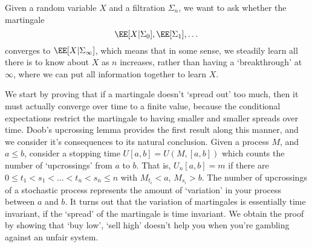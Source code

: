 \begin{example}
    Given a random variable $X$ and a filtration $\Sigma_n$, we want to ask whether the martingale
    \[ \EE[X|\Sigma_0], \EE[\Sigma_1], \dots \]
    converges to $\EE[X|\Sigma_\infty]$, which means that in some sense, we steadily learn all there is to know about $X$ as $n$ increases, rather than having a `breakthrough' at $\infty$, where we can put all information together to learn $X$.
\end{example}

We start by proving that if a martingale doesn't `spread out' too much, then it must actually converge over time to a finite value, because the conditional expectations restrict the martingale to having smaller and smaller spreads over time. Doob's upcrossing lemma provides the first result along this manner, and we consider it's consequences to its natural conclusion. Given a process $M$, and $a \leq b$, consider a stopping time $U[a,b] = U(M,[a,b])$ which counts the number of `upcrossings' from $a$ to $b$. That is, $U_n[a,b] = m$ if there are $0 \leq t_1 < s_1 < \dots < t_n < s_n \leq n$ with $M_{t_i} < a$, $M_{s_i} > b$. The number of upcrossings of a stochastic process represents the amount of `variation' in your process between $a$ and $b$. It turns out that the variation of martingales is essentially time invariant, if the `spread' of the martingale is time invariant. We obtain the proof by showing that `buy low', `sell high' doesn't help you when you're gambling against an unfair system.

